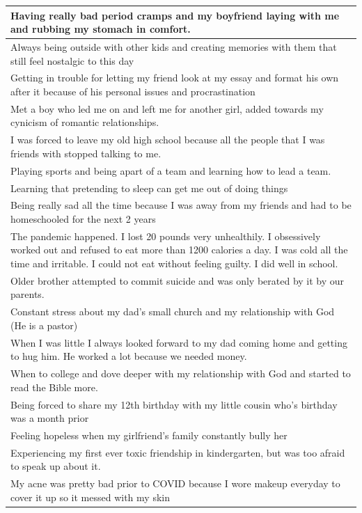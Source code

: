 \documentclass[
  .7em,
  letterpaper,
  DIV=11,
  numbers=noendperiod]{scrartcl}
\begin{document}
\begin{table}
\begin{tabular}{l}
\hline
Having really bad period cramps and my boyfriend laying with me and rubbing my stomach in comfort.\\
\hline
Always being outside with other kids and creating memories with them that still feel nostalgic to this day\\
\hline
Getting in trouble for letting my friend look at my essay and format his own after it because of his personal issues and procrastination\\
\hline
Met a boy who led me on and left me for another girl, added towards my cynicism of romantic relationships.\\
\hline
I was forced to leave my old high school because all the people that I was friends with stopped talking to me.\\
\hline
Playing sports and being apart of a team and learning how to lead a team.\\
\hline
Learning that pretending to sleep can get me out of doing things\\
\hline
Being really sad all the time because I was away from my friends and had to be homeschooled for the next 2 years\\
\hline
The pandemic happened. I lost 20 pounds very unhealthily. I obsessively worked out and refused to eat more than 1200 calories a day. I was cold all the time and irritable. I could not eat without feeling guilty. I did well in school.\\
\hline
Older brother attempted to commit suicide and was only berated by it by our parents.\\
\hline
Constant stress about my dad's small church and my relationship with God (He is a pastor)\\
\hline
When I was little I always looked forward to my dad coming home and getting to hug him. He worked a lot because we needed money.\\
\hline
When to college and dove deeper with my relationship with God and started to read the Bible more.\\
\hline
Being forced to share my 12th birthday with my little cousin who's birthday was a month prior\\
\hline
Feeling hopeless when my girlfriend's family constantly bully her\\
\hline
Experiencing my first ever toxic friendship in kindergarten, but was too afraid to speak up about it.\\
\hline
My acne was pretty bad prior to COVID because I wore makeup everyday to cover it up so it messed with my skin\\

\end{tabular}
\end{table}
\end{document}
